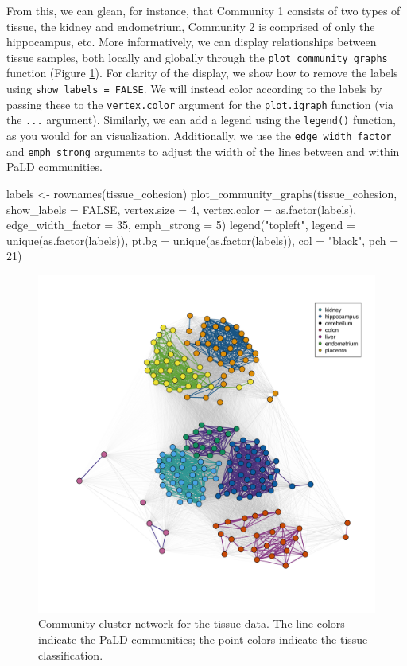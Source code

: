 From this, we can glean, for instance, that Community 1 consists of two
types of tissue, the kidney and endometrium, Community 2 is comprised of
only the hippocampus, etc. More informatively, we can display
relationships between tissue samples, both locally and globally through
the \texttt{plot\_community\_graphs} function (Figure \ref{fig:fig4}).
For clarity of the display, we show how to remove the labels using
\texttt{show\_labels\ =\ FALSE}. We will instead color according to the
labels by passing these to the \texttt{vertex.color} argument for the
\texttt{plot.igraph} function (via the \texttt{...} argument).
Similarly, we can add a legend using the \texttt{legend()} function, as
you would for an  visualization. Additionally, we use
the \texttt{edge\_width\_factor} and \texttt{emph\_strong} arguments to
adjust the width of the lines between and within PaLD communities.

\begin{Schunk}
\begin{Sinput}
labels <- rownames(tissue_cohesion)
plot_community_graphs(tissue_cohesion,
                      show_labels = FALSE,
                      vertex.size = 4,
                      vertex.color = as.factor(labels),
                      edge_width_factor = 35,
                      emph_strong = 5) 
legend("topleft", 
       legend = unique(as.factor(labels)), 
       pt.bg = unique(as.factor(labels)),
       col = "black",
       pch = 21)
\end{Sinput}
\end{Schunk}

\begin{Schunk}
\begin{figure}
\includegraphics[width=1\linewidth]{fig5} \caption[Community cluster network for the tissue data]{Community cluster network for the tissue data. The line colors indicate the PaLD communities; the point colors indicate the tissue classification.}\label{fig:fig4}
\end{figure}
\end{Schunk}

